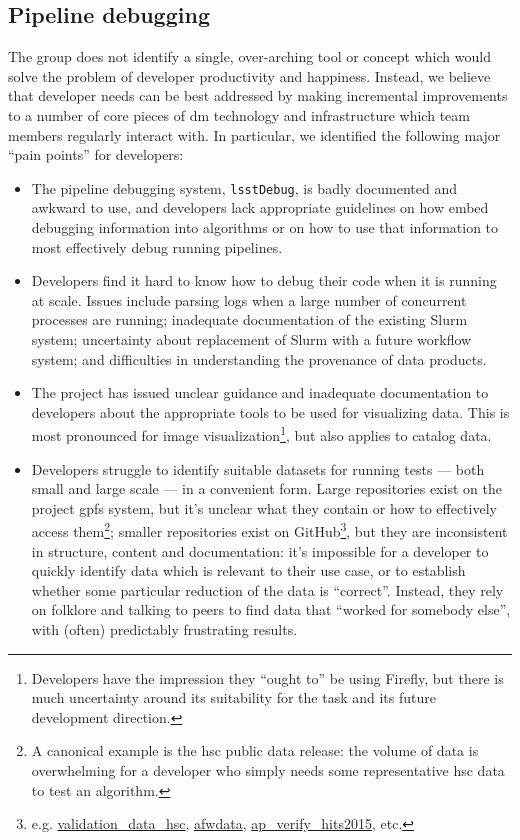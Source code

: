 \subsection{Pipeline debugging}
\label{sec:design:debug}

The group does not identify a single, over-arching tool or concept which would
solve the problem of developer productivity and happiness. Instead, we believe
that developer needs can be best addressed by making incremental improvements
to a number of core pieces of \gls{dm} technology and infrastructure which
team members regularly interact with. In particular, we identified the
following major ``pain points'' for developers:

\begin{itemize}

  \item{The pipeline debugging system, \texttt{lsstDebug}, is badly documented
  and awkward to use, and developers lack appropriate guidelines on how embed
  debugging information into algorithms or on how to use that information to
  most effectively debug running pipelines.}

  \item{Developers find it hard to know how to debug their code when it is
  running at scale. Issues include parsing logs when a large number of
  concurrent processes are running; inadequate documentation of the existing
  Slurm system; uncertainty about replacement of Slurm with a future workflow
  system; and difficulties in understanding the \gls{provenance} of data
  products.}

  \item{The project has issued unclear guidance and inadequate documentation
  to developers about the appropriate tools to be used for visualizing data.
  This is most pronounced for image visualization\footnote{Developers have the
  impression they ``ought to'' be using Firefly, but there is much uncertainty
  around its suitability for the task and its future development direction.},
  but also applies to catalog data.}

  \item{Developers struggle to identify suitable datasets for running tests
  --- both small and large scale --- in a convenient form. Large repositories
  exist on the project \gls{gpfs} system, but it's unclear what they contain
  or how to effectively access them\footnote{A canonical example is the
  \gls{hsc} public data release: the volume of data is overwhelming for a
  developer who simply needs some representative \gls{hsc} data to test an
  algorithm.}; smaller repositories exist on GitHub\footnote{e.g.
  \href{https://github.com/lsst/validation_data_hsc}{validation\_data\_hsc},
  \href{https://github.com/lsst/afwdata}{afwdata},
  \href{https://github.com/lsst/ap_verify_hits2015}{ap\_verify\_hits2015},
  etc.}, but they are inconsistent in structure, content and documentation:
  it's impossible for a developer to quickly identify data which is relevant
  to their use case, or to establish whether some particular reduction of the
  data is ``correct''. Instead, they rely on folklore and talking to peers to
  find data that ``worked for somebody else'', with (often) predictably
  frustrating results.}


\end{itemize}
